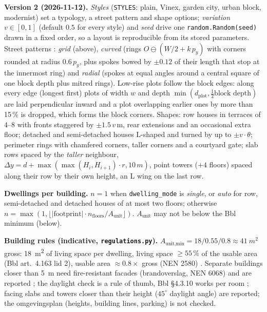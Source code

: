\documentclass[11pt]{article}
\newcommand{\code}[1]{\texttt{#1}}
\begin{document}
\textbf{Version 2 (2026-11-12).} \emph{Styles} (\code{STYLES}: plain, Vinex, garden city, urban block, modernist) set a typology, a street pattern and shape options; \emph{variation} $v \in [0,1]$ (default $0.5$ for every style) and \emph{seed} drive one \code{random.Random(seed)} drawn in a fixed order, so a layout is reproducible from its stored parameters. Street patterns \cite{ParishMuller2001}: \emph{grid} (above), \emph{curved} (rings $O \ominus (W/2 + k\,p_y)$ with corners rounded at radius $0.6\,p_y$, plus spokes bowed by $\pm 0.12$ of their length that stop at the innermost ring) and \emph{radial} (spokes at equal angles around a central square of one block depth plus mitred rings). Low-rise plots follow the block edges: along every edge (longest first) plots of width $w$ and depth $\min(d_{\text{plot}}, \tfrac12 \text{block depth})$ are laid perpendicular inward and a plot overlapping earlier ones by more than 15\,\% is dropped, which forms the block corners. Shapes: row houses in terraces of 4--8 with fronts staggered by $\pm 1.5\,v$\,m, rear extensions and an occasional extra floor; detached and semi-detached houses L-shaped and turned by up to $\pm v \cdot \theta$; perimeter rings with chamfered corners, taller corners and a courtyard gate; slab rows spaced by the \emph{taller} neighbour, $\Delta y = d + \max(\max(H_i, H_{i+1}) \cdot r, 10\,\si{m})$, point towers ($+4$ floors) spaced along their row by their own height, an L wing on the last row.

\textbf{Dwellings per building.} $n = 1$ when \code{dwelling\_mode} is \emph{single}, or \emph{auto} for row, semi-detached and detached houses of at most two floors; otherwise $n = \max(1, \lfloor |\text{footprint}| \cdot n_{\text{floors}} / A_{\text{unit}} \rfloor)$. $A_{\text{unit}}$ may not be below the Bbl minimum (below).

\textbf{Building rules (indicative, \code{regulations.py}).} $A_{\text{unit,min}} = 18 / 0.55 / 0.8 \approx \SI{41}{m^2}$ gross: \SI{18}{m^2} of living space per dwelling, living space $\geq 55\,\%$ of the usable area (Bbl art.\ 4.163 lid 2), usable area $\approx 0.8 \times$ gross (NEN 2580) \cite{Bbl,IPLOindeelbaarheid,IPLOwoning,NEN2580}. Separate buildings closer than \SI{5}{m} need fire-resistant facades (brandoverslag, NEN 6068) and are reported \cite{IPLObrand,NEN6068}; the daylight check is a rule of thumb, Bbl \S4.3.10 works per room \cite{IPLOdaglicht}; facing slabs and towers closer than their height ($45^\circ$ daylight angle) are reported; the omgevingsplan (heights, building lines, parking) is not checked.
\end{document}
